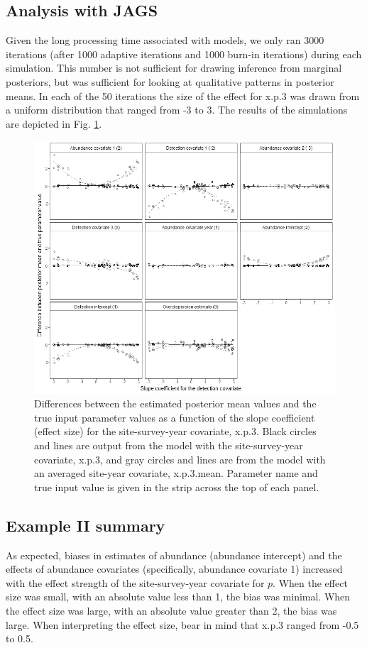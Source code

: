 \documentclass[article]{jss}
\begin{document}
\subsection[Analysis with JAGS]{Analysis with JAGS}
Given the long processing time associated with  models, we only ran 3000 iterations (after 1000 adaptive iterations and 1000 burn-in iterations) during each simulation.  This number is not sufficient for drawing inference from marginal posteriors, but was sufficient for looking at qualitative patterns in posterior means.  In each of the 50 iterations the size of the effect for x.p.3 was drawn from a uniform distribution that ranged from -3 to 3. The results of the simulations are depicted in Fig. \ref{fig:fig2}.

\begin{figure}
  \includegraphics[width=\linewidth]{fig2.jpeg}
  \caption{Differences between the estimated posterior mean values and the true input parameter values as a function of the slope coefficient (effect size) for the site-survey-year covariate, x.p.3.  Black circles and lines are output from the model with the site-survey-year covariate, x.p.3, and gray circles and lines are from the model with an averaged site-year covariate, x.p.3.mean.  Parameter name and true input value is given in the strip across the top of each panel.}
  \label{fig:fig2}
\end{figure}

\subsection[Example II summary]{Example II summary}
As expected, biases in estimates of abundance (abundance intercept) and the effects of abundance covariates (specifically, abundance covariate 1) increased with the effect strength of the site-survey-year covariate for $p$. When the effect size was small, with an absolute value less than 1, the bias was minimal.  When the effect size was large, with an absolute value greater than 2, the bias was large.  When interpreting the effect size, bear in mind that x.p.3 ranged from -0.5 to 0.5.
\end{document}
